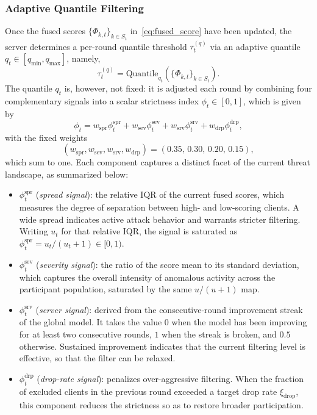 \documentclass[journal]{IEEEtran}
\begin{document}
\subsubsection{Adaptive Quantile Filtering}
Once the fused scores $\{\Phi_{k,t}\}_{k\in S_t}$ in~\eqref{eq:fused_score} have been updated, the server determines a per-round quantile threshold $\tau_t^{(q)}$ via an adaptive quantile $q_t \in [q_{\min}, q_{\max}]$, namely,
\begin{equation}
\tau_t^{(q)} = \text{Quantile}_{q_t}\!\left(\{\Phi_{k,t}\}_{k \in S_t}\right).
\label{eq:filt_threshold}
\end{equation}
The quantile $q_t$ is, however, not fixed: it is adjusted each round by combining four complementary signals into a scalar strictness index $\phi_t \in [0,1]$, which is given by
\begin{equation}
\phi_t = w_{\mathrm{spr}} \phi_t^{\mathrm{spr}} + w_{\mathrm{sev}} \phi_t^{\mathrm{sev}} + w_{\mathrm{srv}} \phi_t^{\mathrm{srv}} + w_{\mathrm{drp}} \phi_t^{\mathrm{drp}},
\label{eq:strictness}
\end{equation}
with the fixed weights
\begin{equation}
(w_{\mathrm{spr}}, w_{\mathrm{sev}}, w_{\mathrm{srv}}, w_{\mathrm{drp}}) = (0.35,\, 0.30,\, 0.20,\, 0.15),
\label{eq:w_values}
\end{equation}
which sum to one. Each component captures a distinct facet of the current threat landscape, as summarized below:
\begin{itemize}
    \item $\phi_t^{\mathrm{spr}}$ (\emph{spread signal}): the relative IQR of the current fused scores, which measures the degree of separation between high- and low-scoring clients. A wide spread indicates active attack behavior and warrants stricter filtering. Writing $u_t$ for that relative IQR, the signal is saturated as $\phi_t^{\mathrm{spr}} = u_t/(u_t+1) \in [0,1)$.
    \item $\phi_t^{\mathrm{sev}}$ (\emph{severity signal}): the ratio of the score mean to its standard deviation, which captures the overall intensity of anomalous activity across the participant population, saturated by the same $u/(u+1)$ map.
    \item $\phi_t^{\mathrm{srv}}$ (\emph{server signal}): derived from the consecutive-round improvement streak of the global model. It takes the value $0$ when the model has been improving for at least two consecutive rounds, $1$ when the streak is broken, and $0.5$ otherwise. Sustained improvement indicates that the current filtering level is effective, so that the filter can be relaxed.
    \item $\phi_t^{\mathrm{drp}}$ (\emph{drop-rate signal}): penalizes over-aggressive filtering. When the fraction of excluded clients in the previous round exceeded a target drop rate $\xi_{\mathrm{drop}}$, this component reduces the strictness so as to restore broader participation.
\end{itemize}
\end{document}
